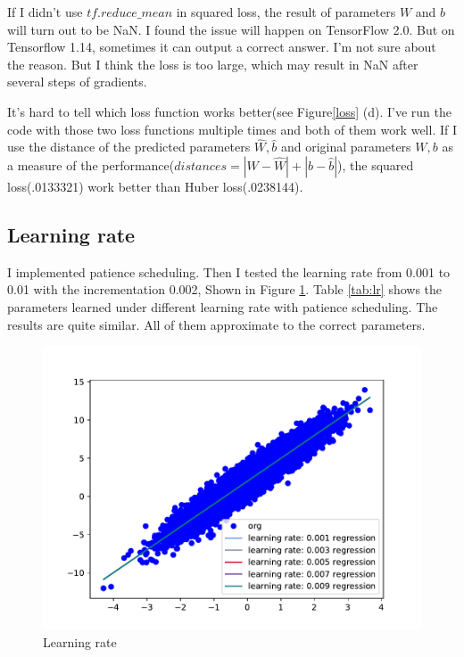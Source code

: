 \documentclass{article}
\begin{document}
If I didn't use $tf.reduce\_mean$ in squared loss, the result of parameters $W$ and $b$ will turn out to be NaN. I found the issue will happen on TensorFlow 2.0. But on Tensorflow 1.14, sometimes it can output a correct answer. I'm not sure about the reason. But I think the loss is too large, which may result in NaN after several steps of gradients. 

It's hard to tell which loss function works better(see Figure\ref{loss} (d). I've run the code with those two loss functions multiple times and both of them work well. If I use the distance of the predicted parameters $\hat{W}, \hat{b}$ and original parameters $W, b$ as a measure of the performance($distances = |W-\hat{W}| + |b-\hat{b}|$), the squared loss(.0133321) work better than Huber loss(.0238144).


\subsection{Learning rate}

I implemented patience scheduling. Then I tested the learning rate from 0.001 to 0.01 with the incrementation 0.002, Shown in Figure \ref{lr}. Table \ref{tab:lr} shows the parameters learned under different learning rate with patience scheduling. The results are quite similar. All of them approximate to the correct parameters. 

\begin{figure}
  \centering
  \includegraphics[scale=0.5]{imgs/lr.pdf}
  \caption{Learning rate}
  \label{lr}
\end{figure}
\end{document}
